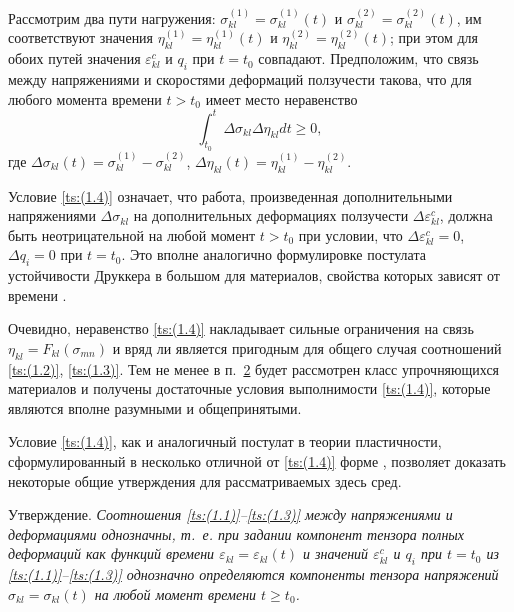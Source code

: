 Рассмотрим два пути нагружения: $\sigma_{kl}^{(1)}=\sigma_{kl}^{(1)}(t)$ и $\sigma_{kl}^{(2)}=\sigma_{kl}^{(2)}(t)$, им соответствуют значения $\eta_{kl}^{(1)}=\eta_{kl}^{(1)}(t)$ и $\eta_{kl}^{(2)}=\eta_{kl}^{(2)}(t)$; 
при этом для обоих путей значения $\varepsilon_{kl}^c$ и $q_{i}$ при $t=t_{0}$ совпадают. 
Предположим, что связь между напряжениями и скоростями деформаций ползучести такова, что для любого момента времени $t>t_{0}$ имеет место неравенство 
\begin{equation}
\label{ts:(1.4)}
\int_{t_{0}}^{t}\Delta\sigma_{kl}\Delta\eta_{kl}dt\geq 0,
\end{equation}
где $\Delta\sigma_{kl}(t)=\sigma_{kl}^{(1)}-\sigma_{kl}^{(2)}$, $\Delta\eta_{kl}(t)=\eta_{kl}^{(1)}-\eta_{kl}^{(2)}$.

Условие \eqref{ts:(1.4)} означает, что работа, произведенная дополнительными напряжениями $\Delta\sigma_{kl}$ на дополнительных деформациях ползучести $\Delta\varepsilon_{kl}^c$, 
должна быть неотрицательной на любой момент $t>t_{0}$ при условии, что $\Delta\varepsilon_{kl}^c=0$, $\Delta q_{i}=0$ при 
$t=t_{0}$. 
Это вполне аналогично формулировке постулата устойчивости Друккера в большом для материалов, свойства которых зависят от времени \cite{ts:Drucker}.

Очевидно, неравенство \eqref{ts:(1.4)} накладывает сильные ограничения на связь $\eta_{kl}=F_{kl}(\sigma_{mn})$ и вряд ли является пригодным для общего случая соотношений \eqref{ts:(1.2)}, \eqref{ts:(1.3)}. 
Тем не менее в п.~\hyperlink{ts:2}{2} будет рассмотрен класс упрочняющихся материалов и получены достаточные условия выполнимости \eqref{ts:(1.4)}, которые являются вполне разумными и общепринятыми.

Условие \eqref{ts:(1.4)}, как и аналогичный постулат в теории пластичности, 
сформулированный в несколько отличной от \eqref{ts:(1.4)} форме \cite{ts:Koiter}, 
позволяет доказать некоторые общие утверждения для рассматриваемых здесь сред.

\smallskip

{\small \sc Утверждение.} \it
Соотношения  \eqref{ts:(1.1)}--\eqref{ts:(1.3)} между напряжениями и деформациями однозначны, 
т.~е. при задании компонент тензора полных деформаций как функций времени $\varepsilon_{kl}=\varepsilon_{kl}(t)$ и значений $\varepsilon_{kl}^c$ и $q_{i}$  при  $t=t_{0}$ из \eqref{ts:(1.1)}--\eqref{ts:(1.3)} однозначно определяются компоненты тензора напряжений $\sigma_{kl}=\sigma_{kl}(t)$ на любой момент времени $t\geq t_{0}$.

\smallskip

